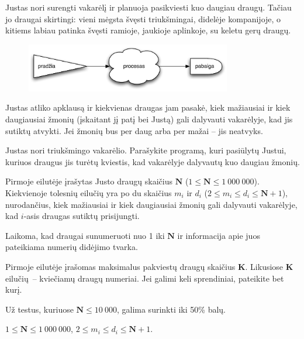 \documentclass{liostyle}
\newcommand{\maxN}{1\ 000\ 000}
\begin{document}

Justas nori surengti vakarėlį ir planuoja pasikviesti kuo 
daugiau draugų. Tačiau jo draugai skirtingi: vieni mėgsta 
švęsti triukšmingai, didelėje kompanijoje, o kitiems labiau 
patinka švęsti ramioje, jaukioje aplinkoje, su keletu gerų 
draugų.

\begin{figure}[h]
\centering
\includegraphics[width=0.8\textwidth]{draugai_fig2}
\end{figure}

Justas atliko apklausą ir kiekvienas draugas jam pasakė, kiek 
mažiausiai ir kiek daugiausiai žmonių (įskaitant jį patį bei 
Justą) gali dalyvauti vakarėlyje, kad jis sutiktų atvykti. Jei
žmonių bus per daug arba per mažai – jis neatvyks.

\Task
Justas nori triukšmingo vakarėlio. Parašykite programą, kuri pasiūlytų 
Justui, kuriuos draugus jis turėtų kviestis, kad vakarėlyje dalyvautų kuo daugiau 
žmonių.

\Input
Pirmoje eilutėje įrašytas Justo draugų skaičius $\mathbf{N}$
($1 \le \mathbf{N} \le \maxN$). Kiekvienoje tolesnių eilučių yra po du skaičius
$m_i$ ir $d_i$ ($2\le m_i\le d_i\le \mathbf{N}+1$), nurodančius, kiek
mažiausiai ir kiek daugiausiai žmonių gali dalyvauti vakarėlyje, kad $i$-asis
draugas sutiktų prisijungti.

Laikoma, kad draugai sunumeruoti nuo 1 iki $\mathbf{N}$ ir informacija apie
juos pateikiama numerių didėjimo tvarka.

\Output
Pirmoje eilutėje įrašomas maksimalus pakviestų draugų skaičius $\mathbf{K}$.
Likusiose $\mathbf{K}$ eilučių~-- kviečiamų draugų numeriai. Jei galimi keli sprendiniai,
pateikite bet kurį.

\Examples
{}

\Grading
Už testus, kuriuose $\mathbf{N} \le 10\ 000$, galima surinkti iki 50\% balų.

\Constraints
$1 \le \mathbf{N} \le \maxN$,\enskip
$2\le m_i\le d_i\le \mathbf{N}+1$.
\end{document}
